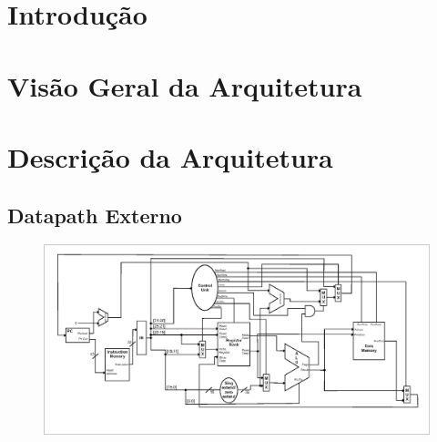\documentclass{report}
\begin{document}
\tableofcontents

\chapter{Introdução}
  
	

\chapter{Visão Geral da Arquitetura}

%	
	
	
	
	

\chapter{Descrição da Arquitetura}

	
	\newpage
	
	\newpage
		
	\newpage
	
	\newpage
	\begin{landscape}
	\section{Datapath Externo}
	\begin{figure}[H]
    	\includegraphics{./pictures/datapath.eps}
  	\end{figure}
  	\end{landscape}

% 
% 
\end{document}
